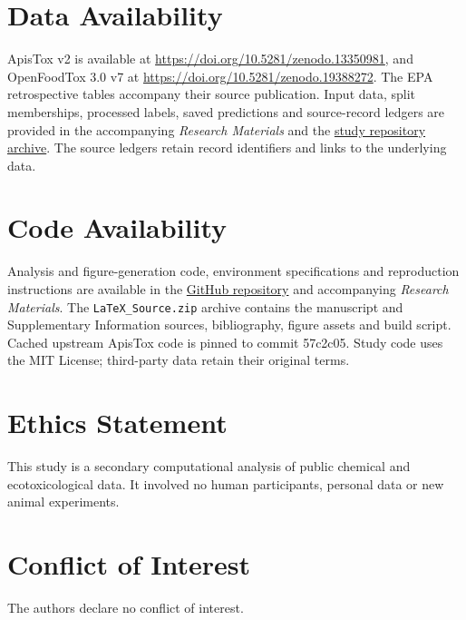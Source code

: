 \documentclass{ieeeaccess}
\begin{document}
\section*{Data Availability}
ApisTox v2 is available at \url{https://doi.org/10.5281/zenodo.13350981}\cite{Adamczyk2025}, and OpenFoodTox 3.0 v7 at \url{https://doi.org/10.5281/zenodo.19388272}\cite{OFT2026}. The EPA retrospective tables accompany their source publication\cite{Farruggia2022}. Input data, split memberships, processed labels, saved predictions and source-record ledgers are provided in the accompanying \textit{Research Materials} and the \href{https://github.com/hiiiy-pm/Endpoint-Definitions-and-Label-Provenance-in-Honey-Bee-Toxicity-Benchmarking/releases/latest}{study repository archive}. The source ledgers retain record identifiers and links to the underlying data.

\section*{Code Availability}
Analysis and figure-generation code, environment specifications and reproduction instructions are available in the \href{https://github.com/hiiiy-pm/Endpoint-Definitions-and-Label-Provenance-in-Honey-Bee-Toxicity-Benchmarking}{GitHub repository} and accompanying \textit{Research Materials}. The \texttt{LaTeX\_Source.zip} archive contains the manuscript and Supplementary Information sources, bibliography, figure assets and build script. Cached upstream ApisTox code is pinned to commit 57c2c05\cite{ApisToxCode}. Study code uses the MIT License; third-party data retain their original terms.

\section*{Ethics Statement}
This study is a secondary computational analysis of public chemical and ecotoxicological data. It involved no human participants, personal data or new animal experiments.

\section*{Conflict of Interest}
The authors declare no conflict of interest.




\newpage
\end{document}

